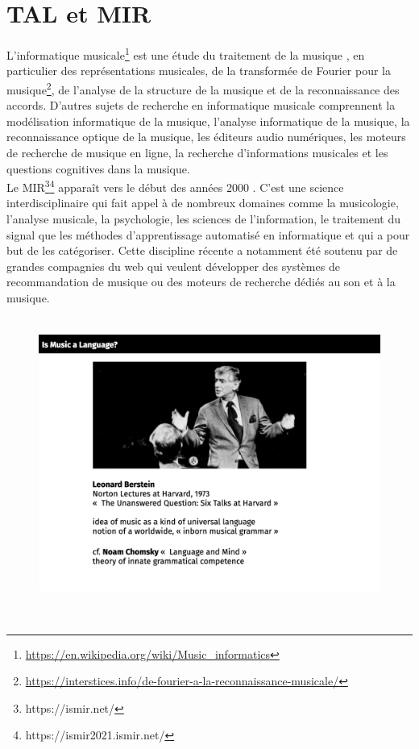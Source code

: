 \section{TAL et MIR}
L'informatique musicale\footnote{\url{https://en.wikipedia.org/wiki/Music_informatics}} est une étude du traitement de la musique \cite{book_muller}, en particulier des représentations musicales, de la transformée de Fourier pour la musique\footnote{\url{https://interstices.info/de-fourier-a-la-reconnaissance-musicale/}}, de l'analyse de la structure de la musique et de la reconnaissance des accords. D'autres sujets de recherche en informatique musicale comprennent la modélisation informatique de la musique, l'analyse informatique de la musique, la reconnaissance optique de la musique, les éditeurs audio numériques, les moteurs de recherche de musique en ligne, la recherche d'informations musicales et les questions cognitives dans la musique.\\
Le MIR\footnote{https://ismir.net/}\footnote{https://ismir2021.ismir.net/} apparaît vers le début des années 2000 \cite{MIR_1}. C’est une science interdisciplinaire qui fait appel à de nombreux domaines comme la musicologie, l’analyse musicale, la psychologie, les sciences de l’information, le traitement du
signal que les méthodes d’apprentissage automatisé en informatique et qui a pour but de les catégoriser. Cette discipline récente a notamment été soutenu par de grandes compagnies du web qui veulent développer des systèmes de recommandation de musique ou des moteurs de recherche dédiés au son et à la musique.\\\\
\begin{figure}[!h]
	\centering
	\includegraphics[height=85mm, width=125mm]{z_images/1_contexte/0_Bernstein.png}
\end{figure}\\
